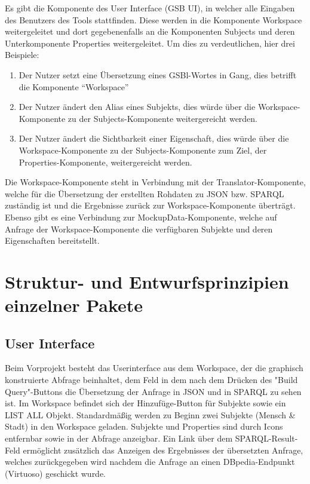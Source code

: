 Es gibt die Komponente des User Interface (GSB UI), in welcher alle
Eingaben des Benutzers des Tools stattfinden. Diese werden in die
Komponente Workspace weitergeleitet und dort gegebenenfalls an die
Komponenten Subjects und deren Unterkomponente Properties
weitergeleitet. Um dies zu verdeutlichen, hier drei Beispiele:
\begin{enumerate}
\item Der Nutzer setzt eine Übersetzung eines GSBl-Wortes in Gang, dies betrifft die Komponente “Workspace”
\item Der Nutzer ändert den Alias eines Subjekts, dies würde über die Workspace-Komponente zu der Subjects-Komponente weitergereicht werden.
\item Der Nutzer ändert die Sichtbarkeit einer Eigenschaft, dies würde über die Workspace-Komponente zu der Subjects-Komponente zum Ziel, der Properties-Komponente, weitergereicht werden.
\end{enumerate}
Die Workspace-Komponente steht in Verbindung mit der
Translator-Komponente, welche für die Übersetzung der erstellten
Rohdaten zu JSON bzw. SPARQL zuständig ist und die Ergebnisse zurück
zur Workspace-Komponente überträgt.
Ebenso gibt es eine Verbindung zur MockupData-Komponente, welche auf Anfrage der Workspace-Komponente die verfügbaren Subjekte und deren Eigenschaften bereitstellt.


\section{Struktur- und Entwurfsprinzipien einzelner Pakete}

\subsection{User Interface}

Beim Vorprojekt besteht das Userinterface aus dem Workspace, der die graphisch konstruierte Abfrage beinhaltet, dem Feld in dem nach dem Drücken des "Build Query"-Buttons die Übersetzung der Anfrage in JSON und in SPARQL zu sehen ist. Im Workspace befindet sich der Hinzufüge-Button für Subjekte sowie ein LIST ALL Objekt. Standardmäßig werden zu Beginn zwei Subjekte (Mensch \& Stadt) in den Workspace geladen. Subjekte und Properties sind durch Icons entfernbar sowie in der Abfrage anzeigbar.
Ein Link über dem SPARQL-Result-Feld ermöglicht zusätzlich das Anzeigen des Ergebnisses der übersetzten Anfrage, welches zurückgegeben wird nachdem die Anfrage an einen DBpedia-Endpunkt (Virtuoso) geschickt wurde.

